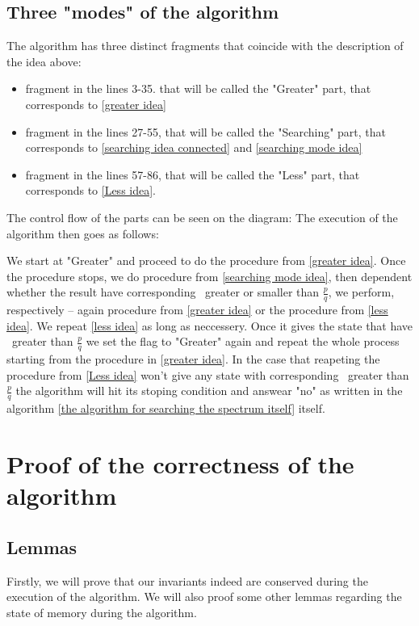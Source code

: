 \subsection{Three "modes" of the algorithm}
The algorithm has three distinct fragments that coincide with 
the description of the idea above: 
\begin{itemize}
\item fragment in the lines 3-35. that will be called the "Greater" part, 
that corresponds to \ref{greater idea}
\item fragment in the lines 27-55, that will be called the "Searching" part, 
that corresponds to \ref{searching idea connected} and \ref{searching mode idea}
\item fragment in the lines 57-86, that will be called the "Less" part, that 
corresponds to \ref{Less idea}.
\end{itemize}

The control flow of the parts can be seen on the diagram:
The execution of the algorithm then goes as follows:

We start at "Greater" and proceed to do the procedure from \ref{greater idea}. 
Once the procedure stops, we do procedure from \ref{searching mode idea}, then 
dependent whether the result have corresponding \Eoc\ greater or smaller than $\frac{p}{q}$, 
we perform, respectively -- again procedure from \ref{greater idea} or the 
procedure from \ref{less idea}. We repeat \ref{less idea} as long as neccessery. 
Once it gives the state that have \Eoc\ greater than $\frac{p}{q}$ we set the flag to 
"Greater" again and repeat the whole process starting from the procedure in \ref{greater idea}. 
In the case that reapeting the procedure from \ref{Less idea} won't give any state with 
corresponding \Eoc\ greater than $\frac{p}{q}$ the algorithm will hit its stoping condition 
and answear "no" as written in the algorithm 
\ref{the algorithm for searching the spectrum itself} itself.   
\section{Proof of the correctness of the algorithm}\label{memory state proof}
\subsection{Lemmas}\label{lemmas for the proof of the correctness}
Firstly, we will prove that our invariants indeed are conserved during the execution 
of the algorithm. We will also proof some other lemmas regarding the state of memory 
during the algorithm.

